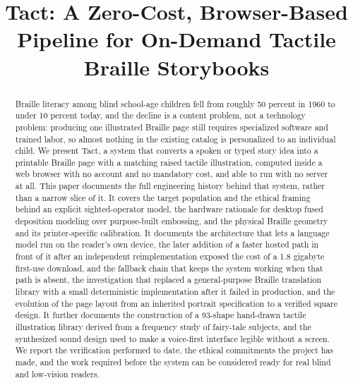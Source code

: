 \documentclass[conference]{IEEEtran}
\begin{document}
\title{Tact: A Zero-Cost, Browser-Based Pipeline for On-Demand Tactile Braille Storybooks}

\author{
}

\maketitle

\begin{abstract}
Braille literacy among blind school-age children fell from roughly 50 percent in 1960 to under 10 percent today, and the decline is a content problem, not a technology problem: producing one illustrated Braille page still requires specialized software and trained labor, so almost nothing in the existing catalog is personalized to an individual child. We present Tact, a system that converts a spoken or typed story idea into a printable Braille page with a matching raised tactile illustration, computed inside a web browser with no account and no mandatory cost, and able to run with no server at all. This paper documents the full engineering history behind that system, rather than a narrow slice of it. It covers the target population and the ethical framing behind an explicit sighted-operator model, the hardware rationale for desktop fused deposition modeling over purpose-built embossing, and the physical Braille geometry and its printer-specific calibration. It documents the architecture that lets a language model run on the reader's own device, the later addition of a faster hosted path in front of it after an independent reimplementation exposed the cost of a 1.8 gigabyte first-use download, and the fallback chain that keeps the system working when that path is absent, the investigation that replaced a general-purpose Braille translation library with a small deterministic implementation after it failed in production, and the evolution of the page layout from an inherited portrait specification to a verified square design. It further documents the construction of a 93-shape hand-drawn tactile illustration library derived from a frequency study of fairy-tale subjects, and the synthesized sound design used to make a voice-first interface legible without a screen. We report the verification performed to date, the ethical commitments the project has made, and the work required before the system can be considered ready for real blind and low-vision readers.
\end{abstract}
\end{document}
